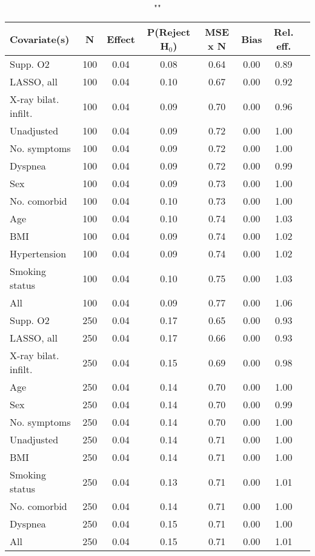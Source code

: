 \documentclass{article}
\begin{document}
{\tabcolsep=6pt  %
\begin{longtable}{lccccccc}
\caption{""} \\
Covariate(s) & N & Effect & P(Reject H$_0$) & MSE x N & Bias & Rel. eff.\\ \midrule
Supp. O2 & 100 & 0.04 & 0.08 & 0.64 & 0.00 & 0.89 \\ 
LASSO, all & 100 & 0.04 & 0.10 & 0.67 & 0.00 & 0.92 \\ 
X-ray bilat. infilt. & 100 & 0.04 & 0.09 & 0.70 & 0.00 & 0.96 \\ 
Unadjusted & 100 & 0.04 & 0.09 & 0.72 & 0.00 & 1.00 \\ 
No. symptoms & 100 & 0.04 & 0.09 & 0.72 & 0.00 & 1.00 \\ 
Dyspnea & 100 & 0.04 & 0.09 & 0.72 & 0.00 & 0.99 \\ 
Sex & 100 & 0.04 & 0.09 & 0.73 & 0.00 & 1.00 \\ 
No. comorbid & 100 & 0.04 & 0.10 & 0.73 & 0.00 & 1.00 \\ 
Age & 100 & 0.04 & 0.10 & 0.74 & 0.00 & 1.03 \\ 
BMI & 100 & 0.04 & 0.09 & 0.74 & 0.00 & 1.02 \\ 
Hypertension & 100 & 0.04 & 0.09 & 0.74 & 0.00 & 1.02 \\ 
Smoking status & 100 & 0.04 & 0.10 & 0.75 & 0.00 & 1.03 \\ 
All & 100 & 0.04 & 0.09 & 0.77 & 0.00 & 1.06 \\ \midrule 
Supp. O2 & 250 & 0.04 & 0.17 & 0.65 & 0.00 & 0.93 \\ 
LASSO, all & 250 & 0.04 & 0.17 & 0.66 & 0.00 & 0.93 \\ 
X-ray bilat. infilt. & 250 & 0.04 & 0.15 & 0.69 & 0.00 & 0.98 \\ 
Age & 250 & 0.04 & 0.14 & 0.70 & 0.00 & 1.00 \\ 
Sex & 250 & 0.04 & 0.14 & 0.70 & 0.00 & 0.99 \\ 
No. symptoms & 250 & 0.04 & 0.14 & 0.70 & 0.00 & 1.00 \\ 
Unadjusted & 250 & 0.04 & 0.14 & 0.71 & 0.00 & 1.00 \\ 
BMI & 250 & 0.04 & 0.14 & 0.71 & 0.00 & 1.00 \\ 
Smoking status & 250 & 0.04 & 0.13 & 0.71 & 0.00 & 1.01 \\ 
No. comorbid & 250 & 0.04 & 0.14 & 0.71 & 0.00 & 1.00 \\ 
Dyspnea & 250 & 0.04 & 0.15 & 0.71 & 0.00 & 1.00 \\ 
All & 250 & 0.04 & 0.15 & 0.71 & 0.00 & 1.01 \\ 

\end{longtable}}
\end{document}
